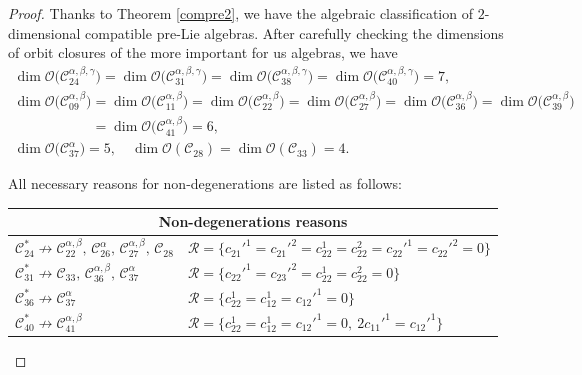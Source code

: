 \documentclass[pdftex]{sigma}
\numberwithin{equation}{section}
\begin{document}
\begin{proof}
 Thanks to Theorem \ref{compre2}, we have the algebraic classification of
 $2$-dimensional compatible pre-Lie algebras.
After carefully checking the dimensions of orbit closures of the more important for us algebras, we have
\begin{gather*}
 \dim \mathcal{O}\bigl(\mathcal{C}_{24}^{\alpha,\beta,\gamma}\bigr)=\dim \mathcal{O}\bigl(\mathcal{C}_{31}^{\alpha,\beta,\gamma}\bigr)=\dim \mathcal{O}\bigl(\mathcal{C}_{38}^{\alpha,\beta,\gamma}\bigr)=\dim \mathcal{O}\bigl(\mathcal{C}_{40}^{\alpha,\beta,\gamma}\bigr) = 7 , \\
\dim \mathcal{O}\bigl(\mathcal{C}_{09}^{\alpha,\beta}\bigr)=
\dim \mathcal{O}\bigl(\mathcal{C}_{11}^{\alpha,\beta}\bigr)=
\dim \mathcal{O}\bigl(\mathcal{C}_{22}^{\alpha,\beta}\bigr)=
\dim \mathcal{O}\bigl(\mathcal{C}_{27}^{\alpha,\beta}\bigr) =
 \dim \mathcal{O}\bigl(\mathcal{C}_{36}^{\alpha,\beta}\bigr)=
\dim \mathcal{O}\bigl(\mathcal{C}_{39}^{\alpha,\beta}\bigr) \\
\phantom{\dim \mathcal{O}\bigl(\mathcal{C}_{09}^{\alpha,\beta}\bigr)}{}=\dim \mathcal{O}\bigl(\mathcal{C}_{41}^{\alpha,\beta}\bigr) = 6 , \\
 \dim \mathcal{O}\bigl(\mathcal{C}_{37}^\alpha\bigr) = 5, \quad
 \dim \mathcal{O}(\mathcal{C}_{28})=\dim \mathcal{O}(\mathcal{C}_{33}) = 4.
\end{gather*}


All necessary reasons for non-degenerations are listed as follows:
\begin{center}\renewcommand{\arraystretch}{1.3}
\begin{tabular}{l|l}
\hline
 \multicolumn{2}{c}{Non-degenerations reasons} \\
\hline
$\mathcal{C}_{24}^{*}
\not \rightarrow
\mathcal{C}_{22}^{\alpha,\beta}, \,
\mathcal{C}_{26}^{\alpha}, \,
\mathcal{C}_{27}^{\alpha,\beta}, \,
\mathcal{C}_{28}$
&
$\mathcal R=\bigl\{c_{21}'^1=c_{21}'^2=c_{22}^1=c_{22}^2=c_{22}'^1=c_{22}'^2=0\bigr\}$\\
\hline
$
\mathcal{C}_{31}^{*}
\not \rightarrow
\mathcal{C}_{33}, \,
\mathcal{C}_{36}^{\alpha,\beta}, \,
\mathcal{C}_{37}^{\alpha}$
&
$\mathcal R=\bigl\{
c_{22}'^1=c_{23}'^2=c_{22}^1=c_{22}^2=0
\bigr\}
$\\
\hline
$\mathcal{C}_{36}^{*}
\not \rightarrow \mathcal{C}_{37}^{\alpha}$
&
$\mathcal R=\bigl\{
c_{22}^1=c_{12}^1=c_{12}'^1=0\bigr\}
$\\
\hline
$\mathcal{C}_{40}^{*}\not \rightarrow\mathcal{C}_{41}^{\alpha,\beta}$
&
$\mathcal R=\bigl\{
c_{22}^1=c_{12}^1=c_{12}'^1=0, \ 2 c_{11}'^1=c_{12}'^1
\bigr\}$\\
\hline
\end{tabular}
\end{center}


\end{proof}
\end{document}
